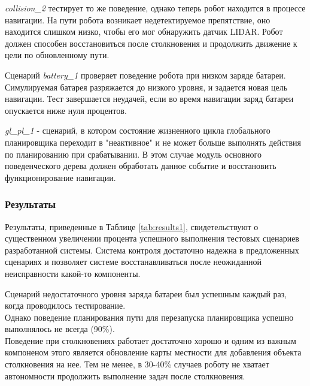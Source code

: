 \textit{collision\_2} тестирует то же поведение, однако теперь робот находится в процессе навигации. На пути робота возникает недетектируемое препятствие, оно находится слишком низко, чтобы его мог обнаружить датчик LIDAR. Робот должен способен восстановиться после столкновения и продолжить движение к цели по обновленному пути.

Сценарий \textit{battery\_1} проверяет поведение робота при низком заряде батареи. Симулируемая батарея разряжается до низкого уровня, и задается новая цель навигации. Тест завершается неудачей, если во время навигации заряд батареи опускается ниже нуля процентов.

\textit{gl\_pl\_1} - сценарий, в котором состояние жизненного цикла глобального планировщика переходит в "неактивное" и не может больше выполнять действия по планированию при срабатывании. В этом случае модуль основного поведенческого дерева должен обработать данное событие и восстановить функционирование навигации. 

\subsubsection{Результаты}

Результаты, приведенные в Таблице \ref*{tab:results1}, свидетельствуют о существенном увеличении процента успешного выполнения тестовых сценариев разработанной системы. Система контроля достаточно надежна в предложенных сценариях и позволяет системе восстанавливаться после неожиданной неисправности какой-то компоненты. 

Сценарий недостаточного уровня заряда батареи был успешным каждый раз, когда проводилось тестирование. \\
Однако поведение планирования пути для перезапуска планировщика успешно выполнялось не всегда (90\%). \\
Поведение при столкновениях работает достаточно хорошо и одним из важным компоненом этого является обновление карты местности для добавления объекта столкновения на нее. Тем не менее, в 30-40\% случаев роботу не хватает автономности продолжить выполнение задач после столкновения. 

